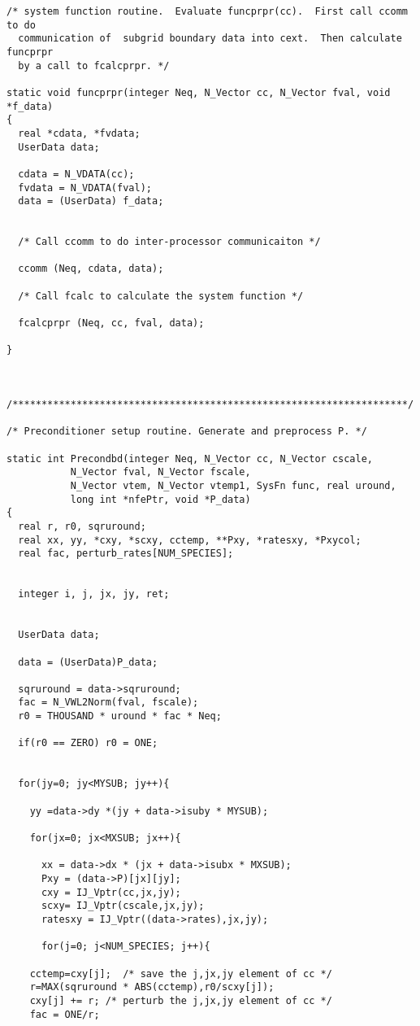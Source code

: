 \begin{verbatim}
/* system function routine.  Evaluate funcprpr(cc).  First call ccomm to do 
  communication of  subgrid boundary data into cext.  Then calculate funcprpr
  by a call to fcalcprpr. */

static void funcprpr(integer Neq, N_Vector cc, N_Vector fval, void *f_data)
{
  real *cdata, *fvdata;
  UserData data;

  cdata = N_VDATA(cc);
  fvdata = N_VDATA(fval);
  data = (UserData) f_data;


  /* Call ccomm to do inter-processor communicaiton */

  ccomm (Neq, cdata, data);

  /* Call fcalc to calculate the system function */

  fcalcprpr (Neq, cc, fval, data);

}



/********************************************************************/

/* Preconditioner setup routine. Generate and preprocess P. */

static int Precondbd(integer Neq, N_Vector cc, N_Vector cscale,
		   N_Vector fval, N_Vector fscale,
		   N_Vector vtem, N_Vector vtemp1, SysFn func, real uround,
		   long int *nfePtr, void *P_data)
{
  real r, r0, sqruround;
  real xx, yy, *cxy, *scxy, cctemp, **Pxy, *ratesxy, *Pxycol;
  real fac, perturb_rates[NUM_SPECIES];


  integer i, j, jx, jy, ret;


  UserData data;

  data = (UserData)P_data;

  sqruround = data->sqruround;
  fac = N_VWL2Norm(fval, fscale);
  r0 = THOUSAND * uround * fac * Neq;

  if(r0 == ZERO) r0 = ONE;


  for(jy=0; jy<MYSUB; jy++){

    yy =data->dy *(jy + data->isuby * MYSUB);

    for(jx=0; jx<MXSUB; jx++){

      xx = data->dx * (jx + data->isubx * MXSUB);
      Pxy = (data->P)[jx][jy];
      cxy = IJ_Vptr(cc,jx,jy);
      scxy= IJ_Vptr(cscale,jx,jy);
      ratesxy = IJ_Vptr((data->rates),jx,jy);

      for(j=0; j<NUM_SPECIES; j++){

	cctemp=cxy[j];  /* save the j,jx,jy element of cc */
	r=MAX(sqruround * ABS(cctemp),r0/scxy[j]);
	cxy[j] += r; /* perturb the j,jx,jy element of cc */
	fac = ONE/r;


\end{verbatim}
